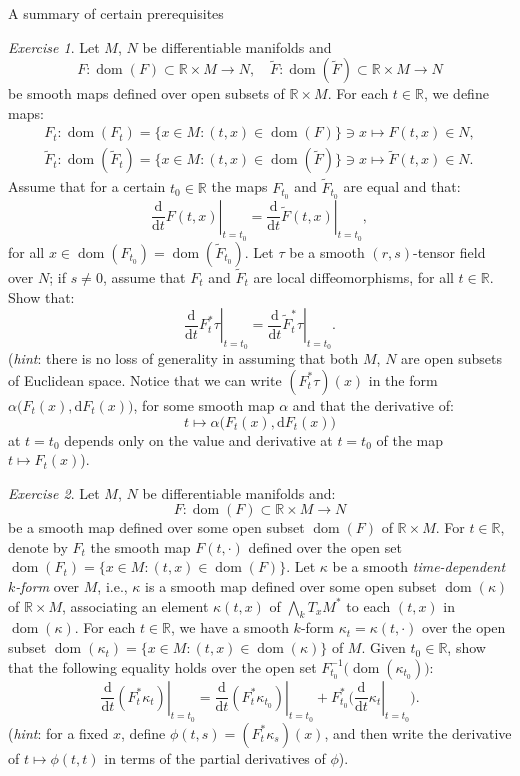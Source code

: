 \documentclass[oneside,a4paper,11pt]{amsbook}
\newcommand{\R}{\mathds R}
\newcommand{\dd}{\mathrm d}
\DeclareMathOperator{\Dom}{dom}
\theoremstyle{remark}\newtheorem{exercise}{Exercise}[chapter]
\theoremstyle{plain}\newtheorem{teo}{Theorem}[section]
\theoremstyle{plain}\newtheorem{lem}[teo]{Lemma}
\theoremstyle{plain}\newtheorem{prop}[teo]{Proposition}
\theoremstyle{plain}\newtheorem{cor}[teo]{Corollary}
\theoremstyle{definition}\newtheorem{defin}[teo]{Definition}
\theoremstyle{remark}\newtheorem{rem}[teo]{Remark}
\theoremstyle{definition}\newtheorem{notation}[teo]{Notation}
\theoremstyle{definition}\newtheorem{convention}[teo]{Convention}
\theoremstyle{definition}\newtheorem{example}[teo]{Example}
\numberwithin{section}{chapter}
\numberwithin{equation}{section}
\begin{document}
\begin{chapter}{A summary of certain prerequisites}
\begin{exercise}\label{exe:tildeFinstead}
Let $M$, $N$ be differentiable manifolds and
\[F:\Dom(F)\subset\R\times M\to N,\quad\widetilde F:\Dom(\widetilde F)\subset\R\times M\to N\]
be smooth maps defined over open subsets of $\R\times M$. For each $t\in\R$, we define maps:
\begin{gather*}
F_t:\Dom(F_t)=\big\{x\in M:(t,x)\in\Dom(F)\big\}\ni x\longmapsto F(t,x)\in N,\\
\widetilde F_t:\Dom(\widetilde F_t)=\big\{x\in M:(t,x)\in\Dom(\widetilde F)\big\}\ni x\longmapsto\widetilde F(t,x)\in N.
\end{gather*}
Assume that for a certain $t_0\in\R$ the maps $F_{t_0}$ and $\widetilde F_{t_0}$ are equal and that:
\[\left.\frac{\dd}{\dd t}F(t,x)\right\vert_{t=t_0}=\left.\frac{\dd}{\dd t}\widetilde F(t,x)\right\vert_{t=t_0},\]
for all $x\in\Dom(F_{t_0})=\Dom(\widetilde F_{t_0})$. Let $\tau$ be a smooth $(r,s)$-tensor field over $N$;
if $s\ne0$, assume that $F_t$ and $\widetilde F_t$ are local diffeomorphisms, for all $t\in\R$. Show that:
\[\left.\frac{\dd}{\dd t}F_t^*\tau\right\vert_{t=t_0}=\left.\frac{\dd}{\dd t}\widetilde F_t^*\tau\right\vert_{t=t_0}.\]
({\em hint}: there is no loss of generality in assuming that both $M$, $N$ are open subsets of Euclidean space.
Notice that we can write $(F_t^*\tau)(x)$ in the form $\alpha\big(F_t(x),\dd F_t(x)\big)$, for some smooth
map $\alpha$ and that the derivative of:
\[t\longmapsto\alpha\big(F_t(x),\dd F_t(x)\big)\]
at $t=t_0$ depends only on the value and derivative at $t=t_0$ of the map $t\mapsto F_t(x)$).
\end{exercise}

\begin{exercise}\label{exe:ddtFtkappat}
Let $M$, $N$ be differentiable manifolds and:
\[F:\Dom(F)\subset\R\times M\longrightarrow N\]
be a smooth map defined over some open subset $\Dom(F)$ of $\R\times M$. For $t\in\R$, denote by $F_t$ the smooth map
$F(t,\cdot)$ defined over the open set $\Dom(F_t)=\big\{x\in M:(t,x)\in\Dom(F)\big\}$. Let $\kappa$ be a smooth {\em time-dependent $k$-form\/} over $M$, i.e.,
$\kappa$ is a smooth map defined over some open subset $\Dom(\kappa)$ of $\R\times M$, associating an element $\kappa(t,x)$ of $\bigwedge_kT_xM^*$ to each
$(t,x)$ in $\Dom(\kappa)$. For each $t\in\R$, we have a smooth $k$-form $\kappa_t=\kappa(t,\cdot)$ over the open subset
$\Dom(\kappa_t)=\big\{x\in M:(t,x)\in\Dom(\kappa)\big\}$ of $M$. Given $t_0\in\R$, show that the following equality holds over the open set
$F_{t_0}^{-1}\big(\!\Dom(\kappa_{t_0})\big)$:
\[\left.\frac{\dd}{\dd t}(F_t^*\kappa_t)\right\vert_{t=t_0}=\left.\frac{\dd}{\dd t}(F_t^*\kappa_{t_0})\right\vert_{t=t_0}
+F_{t_0}^*\Big(\left.\frac{\dd}{\dd t}\kappa_t\right\vert_{t=t_0}\Big).\]
({\em hint}: for a fixed $x$, define $\phi(t,s)=(F_t^*\kappa_s)(x)$, and then write the derivative of $t\mapsto\phi(t,t)$
in terms of the partial derivatives of $\phi$).
\end{exercise}


\end{chapter}
\end{document}

